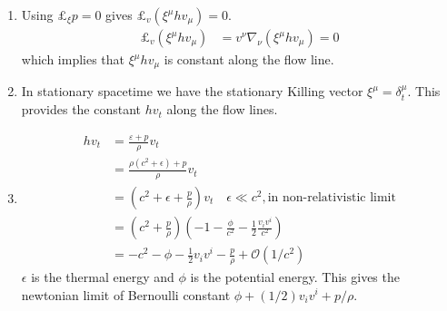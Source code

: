 \documentclass{article}
\begin{document}
\begin{enumerate}
\begin{enumerate}
\item Using $\pounds_\xi p = 0$ gives $\pounds_v(\xi^\mu hv_\mu) = 0$.
  \begin{align*}
    \pounds_v(\xi^\mu hv_\mu)
    & = v^\nu \nabla_\nu (\xi^\mu hv_\mu) = 0
  \end{align*}
  which implies that $\xi^\mu hv_\mu$ is constant along the flow line.
\item In stationary spacetime we have the stationary Killing vector $\xi^\mu = \delta^\mu_t$. This provides the constant $hv_t$ along the flow lines.
\item
  \begin{align*}
    hv_t
    & = \frac{\varepsilon + p}{\rho} v_t\\
    & = \frac{\rho(c^2 + \epsilon) + p}{\rho}v_t\\
    & = (c^2 + \epsilon + \frac{p}{\rho})v_t\quad \epsilon \ll c^2, \text{in non-relativistic limit}\\
    & = ({c^2 + \frac{p}{\rho}})(- 1 - \frac{\phi}{c^2} - \frac{1}{2}\frac{v_i v^i}{c^2})\\
    & = -c^2 - \phi - \frac{1}{2}{v_i v^i} - \frac{p}{\rho} + \mathcal{O}(1/c^2)
  \end{align*}
$\epsilon$ is the thermal energy and $\phi$ is the potential energy. This gives the newtonian limit of Bernoulli constant $\boxed{\phi + (1/2)v_iv^i + p/\rho}$.
\end{enumerate}

\end{enumerate}
\end{document}
